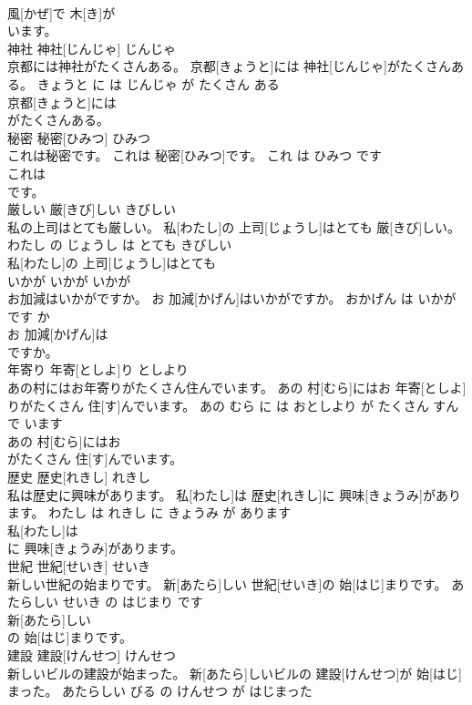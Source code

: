\documentclass[8pt]{extreport}
\begin{document}
\begin{CJK}{UTF8}{min}
\\	風[かぜ]で 木[き]が
\\	います。			
\\	神社	神社[じんじゃ]	じんじゃ	
\\	京都には神社がたくさんある。	京都[きょうと]には 神社[じんじゃ]がたくさんある。	きょうと に は じんじゃ が たくさん ある	
\\	京都[きょうと]には
\\	がたくさんある。			
\\	秘密	秘密[ひみつ]	ひみつ	
\\	これは秘密です。	これは 秘密[ひみつ]です。	これ は ひみつ です	
\\	これは
\\	です。			
\\	厳しい	厳[きび]しい	きびしい	
\\	私の上司はとても厳しい。	私[わたし]の 上司[じょうし]はとても 厳[きび]しい。	わたし の じょうし は とても きびしい	
\\	私[わたし]の 上司[じょうし]はとても
\\	いかが	いかが	いかが	
\\	お加減はいかがですか。	お 加減[かげん]はいかがですか。	おかげん は いかが です か	
\\	お 加減[かげん]は
\\	ですか。			
\\	年寄り	年寄[としよ]り	としより	
\\	あの村にはお年寄りがたくさん住んでいます。	あの 村[むら]にはお 年寄[としよ]りがたくさん 住[す]んでいます。	あの むら に は おとしより が たくさん すんで います	
\\	あの 村[むら]にはお
\\	がたくさん 住[す]んでいます。			
\\	歴史	歴史[れきし]	れきし	
\\	私は歴史に興味があります。	私[わたし]は 歴史[れきし]に 興味[きょうみ]があります。	わたし は れきし に きょうみ が あります	
\\	私[わたし]は
\\	に 興味[きょうみ]があります。			
\\	世紀	世紀[せいき]	せいき	
\\	新しい世紀の始まりです。	新[あたら]しい 世紀[せいき]の 始[はじ]まりです。	あたらしい せいき の はじまり です	
\\	新[あたら]しい
\\	の 始[はじ]まりです。			
\\	建設	建設[けんせつ]	けんせつ	
\\	新しいビルの建設が始まった。	新[あたら]しいビルの 建設[けんせつ]が 始[はじ]まった。	あたらしい びる の けんせつ が はじまった	

\end{CJK}
\end{document}
